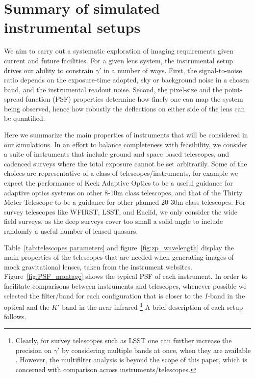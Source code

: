 \documentclass[a4paper,11pt]{article}
\begin{document}

\section{Summary of simulated instrumental setups}

We aim to carry out a systematic exploration of imaging requirements
given current and future facilities. For a given lens system, the
instrumental setup drives our ability to constrain $\gamma'$ in a
number of ways. First, the signal-to-noise ratio depends on the
exposure-time adopted, sky or background noise in a chosen band, and
the instrumental readout noise. Second, the pixel-size and the
point-spread function (PSF) properties determine how finely one can
map the system being observed, hence how robustly the deflections on
either side of the lens can be quantified.

Here we summarize the main properties of instruments that will be
considered in our simulations. In an effort to balance completeness
with feasibility, we consider a suite of instruments that include
ground and space based telescopes, and cadenced surveys where the
total exposure cannot be set arbitrarily. Some of the choices are
representative of a class of telescopes/instruments, for example we
expect the performance of Keck Adaptive Optics to be a useful guidance
for adaptive optics systems on other 8-10m class telescopes, and that
of the Thirty Meter Telescope to be a guidance for other planned
20-30m class telescopes. For survey telescopes like WFIRST, LSST, and
Euclid, we only consider the wide field surveys, as the deep surveys
cover too small a solid angle to include randomly a useful number of
lensed quasars.

Table~\ref{tab:telescopes parameters} and
figure~\ref{fig:zp_wavelength} display the main properties of the
telescopes that are needed when generating images of mock
gravitational lenses, taken from the instrument
websites. Figure~\ref{fig:PSF_montage} shows the typical PSF of each
instrument. In order to facilitate comparisons between instruments and
telescopes, whenever possible we selected the filter/band for each
configuration that is closer to the $I$-band in the optical and the
$K'$-band in the near infrared \footnote{Clearly, for survey
telescopes such as LSST one can further increase the precision on
$\gamma'$ by considering multiple bands at once, when they are
available \cite{2011ApJ...734..104N,2013MNRAS.436..503A}. However, the
multifilter analysis is beyond the scope of this paper, which is
concerned with comparison across instruments/telescopes.} A brief
description of each setup follows.
\end{document}
